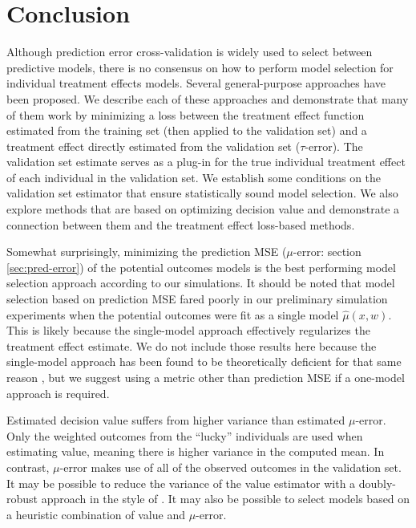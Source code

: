 \section{Conclusion}
\label{conclusion}

Although prediction error cross-validation is widely used to select between predictive models, there is no consensus on how to perform model selection for individual treatment effects models. Several general-purpose approaches have been proposed. We describe each of these approaches and demonstrate that many of them work by minimizing a loss between the treatment effect function estimated from the training set (then applied to the validation set) and a treatment effect directly estimated from the validation set ($\tau$-error). The validation set estimate serves as a plug-in for the true individual treatment effect of each individual in the validation set. We establish some conditions on the validation set estimator that ensure statistically sound model selection. We also explore methods that are based on optimizing decision value and demonstrate a connection between them and the treatment effect loss-based methods. 

Somewhat surprisingly, minimizing the prediction MSE ($\mu$-error: section \ref{sec:pred-error}) of the potential outcomes models is the best performing model selection approach according to our simulations. It should be noted that model selection based on prediction MSE fared poorly in our preliminary simulation experiments when the potential outcomes were fit as a single model $\hat\mu(x,w)$. This is likely because the single-model approach effectively regularizes the treatment effect estimate. We do not include those results here because the single-model approach has been found to be theoretically deficient for that same reason \cite{Alaa:tj}, but we suggest using a metric other than prediction MSE if a one-model approach is required. 

Estimated decision value suffers from higher variance than estimated $\mu$-error. Only the weighted outcomes from the ``lucky'' individuals are used when estimating value, meaning there is higher variance in the computed mean. In contrast, $\mu$-error makes use of all of the observed outcomes in the validation set. It may be possible to reduce the variance of the value estimator with a doubly-robust approach in the style of \citet{Zhang:2012em}. It may also be possible to select models based on a heuristic combination of value and $\mu$-error.

